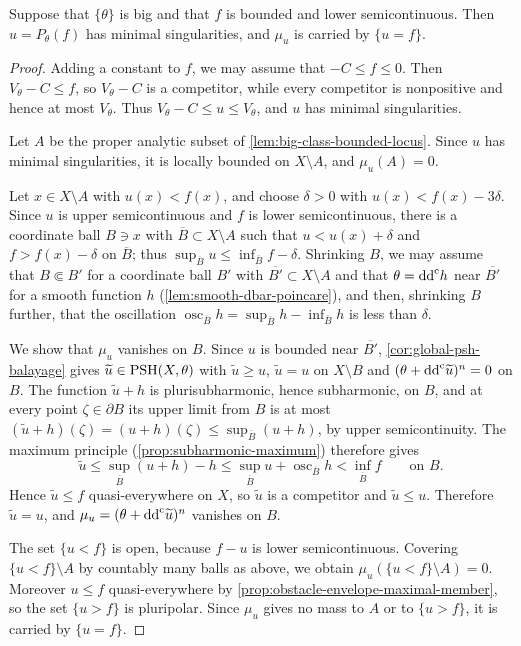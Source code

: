 \begin{lemma}\label{lem:bounded-lsc-obstacle-contact}
Suppose that $\{\theta\}$ is big and that $f$ is bounded and lower semicontinuous. Then $u=P_\theta(f)$ has minimal singularities, and $\mu_u$ is carried by $\{u=f\}$.
\end{lemma}
\begin{proof}
Adding a constant to $f$, we may assume that $-C\leq f\leq0$. Then $V_\theta-C\leq f$, so $V_\theta-C$ is a competitor, while every competitor is nonpositive and hence at most $V_\theta$. Thus $V_\theta-C\leq u\leq V_\theta$, and $u$ has minimal singularities.

Let $A$ be the proper analytic subset of \cref{lem:big-class-bounded-locus}. Since $u$ has minimal singularities, it is locally bounded on $X\setminus A$, and $\mu_u(A)=0$.

Let $x\in X\setminus A$ with $u(x)<f(x)$, and choose $\delta>0$ with $u(x)<f(x)-3\delta$. Since $u$ is upper semicontinuous and $f$ is lower semicontinuous, there is a coordinate ball $B\ni x$ with $\overline B\subset X\setminus A$ such that $u<u(x)+\delta$ and $f>f(x)-\delta$ on $\overline B$; thus $\sup_{\overline B}u\leq\inf_{\overline B}f-\delta$. Shrinking $B$, we may assume that $B\Subset B'$ for a coordinate ball $B'$ with $\overline{B'}\subset X\setminus A$ and that $\theta=\mathrm{dd}^{\mathrm{c}} h$ near $\overline{B'}$ for a smooth function $h$ (\cref{lem:smooth-dbar-poincare}), and then, shrinking $B$ further, that the oscillation $\operatorname{osc}_{\overline B}h=\sup_{\overline B}h-\inf_{\overline B}h$ is less than $\delta$.

We show that $\mu_u$ vanishes on $B$. Since $u$ is bounded near $\overline{B'}$, \cref{cor:global-psh-balayage} gives $\widetilde u\in\mathrm{PSH}(X,\theta)$ with $\widetilde u\geq u$, $\widetilde u=u$ on $X\setminus B$ and $(\theta+\mathrm{dd}^{\mathrm{c}}\widetilde u)^n=0$ on $B$. The function $\widetilde u+h$ is plurisubharmonic, hence subharmonic, on $B$, and at every point $\zeta\in\partial B$ its upper limit from $B$ is at most $(\widetilde u+h)(\zeta)=(u+h)(\zeta)\leq\sup_{\overline B}(u+h)$, by upper semicontinuity. The maximum principle (\cref{prop:subharmonic-maximum}) therefore gives
\[
 \widetilde u\leq\sup_{\overline B}(u+h)-h
            \leq\sup_{\overline B}u+\operatorname{osc}_{\overline B}h
            <\inf_{\overline B}f
 \qquad\text{on }B.
\]
Hence $\widetilde u\leq f$ quasi-everywhere on $X$, so $\widetilde u$ is a competitor and $\widetilde u\leq u$. Therefore $\widetilde u=u$, and $\mu_u=(\theta+\mathrm{dd}^{\mathrm{c}}\widetilde u)^n$ vanishes on $B$.

The set $\{u<f\}$ is open, because $f-u$ is lower semicontinuous. Covering $\{u<f\}\setminus A$ by countably many balls as above, we obtain $\mu_u(\{u<f\}\setminus A)=0$. Moreover $u\leq f$ quasi-everywhere by \cref{prop:obstacle-envelope-maximal-member}, so the set $\{u>f\}$ is pluripolar. Since $\mu_u$ gives no mass to $A$ or to $\{u>f\}$, it is carried by $\{u=f\}$.
\end{proof}

